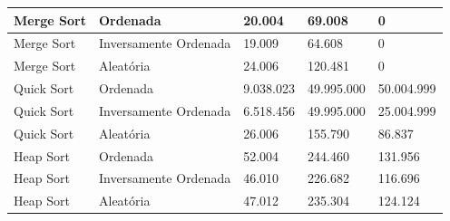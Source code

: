 \documentclass[tcc2]{uftex}
\begin{document}
\begin{table}[h]
\begin{tabular}{|l|l|l|l|l|}
Merge Sort           & Ordenada                     & 20.004              & 69.008               & 0              \\ \hline
Merge Sort           & Inversamente Ordenada        & 19.009              & 64.608               & 0              \\ \hline
Merge Sort           & Aleatória                    & 24.006              & 120.481              & 0              \\ \hline
Quick Sort           & Ordenada                     & 9.038.023           & 49.995.000           & 50.004.999     \\ \hline
Quick Sort           & Inversamente Ordenada        & 6.518.456           & 49.995.000           & 25.004.999     \\ \hline
Quick Sort           & Aleatória                    & 26.006              & 155.790              & 86.837         \\ \hline
Heap Sort            & Ordenada                     & 52.004              & 244.460              & 131.956        \\ \hline
Heap Sort            & Inversamente Ordenada        & 46.010              & 226.682              & 116.696        \\ \hline
Heap Sort            & Aleatória                    & 47.012              & 235.304              & 124.124        \\ \hline
\end{tabular}
\end{table}
\end{document}
